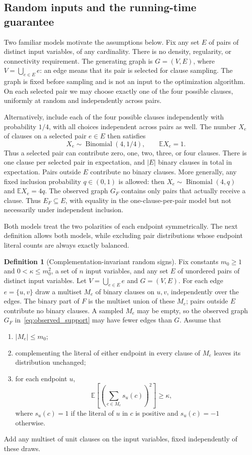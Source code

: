 \documentclass[11pt,a4paper]{article}
\theoremstyle{definition}
\newtheorem{definition}[theorem]{Definition}
\theoremstyle{remark}
\newcommand{\E}{\mathbb E}
\begin{document}
\subsection{Random inputs and the running-time guarantee}

Two familiar models motivate the assumptions below. Fix any set $E$
of pairs of distinct input variables, of any cardinality. There is no
density, regularity, or connectivity requirement. The generating graph
is $G=(V,E)$, where $V=\bigcup_{e\in E}e$: an edge means that its pair
is selected for clause sampling. The graph is fixed before sampling and
is not an input to the optimization algorithm. On each
selected pair we may choose exactly one of the four possible clauses,
uniformly at random and independently across pairs.

Alternatively, include each of the four possible clauses independently
with probability $1/4$, with all choices independent across pairs as well.
The number $X_e$ of clauses on a selected pair $e\in E$ then satisfies
\[
 X_e\sim\operatorname{Binomial}(4,1/4),\qquad \E X_e=1.
\]
Thus a selected pair can contribute zero, one, two, three, or four clauses.
There is one clause per selected pair in expectation, and $|E|$ binary
clauses in total in expectation. Pairs outside $E$ contribute no binary
clauses. More generally, any fixed inclusion probability $q\in(0,1)$ is
allowed: then $X_e\sim\operatorname{Binomial}(4,q)$ and $\E X_e=4q$.
The observed graph $G_F$ contains only pairs that actually receive a
clause. Thus $E_F\subseteq E$, with equality in the one-clause-per-pair
model but not necessarily under independent inclusion.

Both models treat the two polarities of each endpoint symmetrically.
The next definition allows both models, while excluding pair distributions
whose endpoint literal counts are always exactly balanced.

\begin{definition}[Complementation-invariant random signs]\label{def:invariant}
Fix constants $m_0\ge1$ and $0<\kappa\le m_0^2$, a set of $n$ input variables,
and any set $E$ of unordered pairs of distinct input variables.
Let $V=\bigcup_{e\in E}e$ and $G=(V,E)$.
For each edge $e=\{u,v\}$ draw a multiset $M_e$ of binary clauses on
$u,v$, independently over the edges. The binary part of $F$ is the
multiset union of these $M_e$; pairs outside $E$ contribute no binary
clauses. A sampled $M_e$ may be empty, so the observed graph $G_F$
in~\eqref{eq:observed_support} may have fewer edges than $G$. Assume that
\begin{enumerate}
\item $|M_e|\le m_0$;
\item complementing the literal of either endpoint in every clause of
$M_e$ leaves its distribution unchanged;
\item for each endpoint $u$,
\[
 \E\left[\left(\sum_{c\in M_e}s_u(c)\right)^2\right]\ge\kappa,
\]
where $s_u(c)=1$ if the literal of $u$ in $c$ is positive and
$s_u(c)=-1$ otherwise.
\end{enumerate}
Add any multiset of unit clauses on the input variables, fixed
independently of these draws.
\end{definition}
\end{document}
